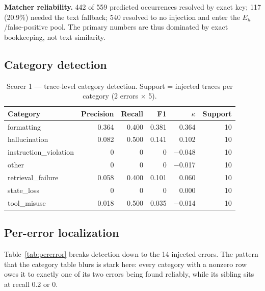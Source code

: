 \documentclass[11pt]{article}
\begin{document}
\textbf{Matcher reliability.} 442 of 559 predicted occurrences resolved by exact key; 117 (20.9\%) needed the text fallback; 540 resolved to no injection and enter the $E_h$/false-positive pool. The primary numbers are thus dominated by exact bookkeeping, not text similarity.

\subsection{Category detection}

\begin{table}[h]
\centering
\small
\begin{tabular}{lrrrrr}
\toprule
Category & Precision & Recall & F1 & $\kappa$ & Support \\
\midrule
formatting              & 0.364 & 0.400 & 0.381 & \phantom{$-$}0.364 & 10 \\
hallucination           & 0.082 & 0.500 & 0.141 & \phantom{$-$}0.102 & 10 \\
instruction\_violation  & 0     & 0     & 0     & $-$0.048 & 10 \\
other                   & 0     & 0     & 0     & $-$0.017 & 10 \\
retrieval\_failure      & 0.058 & 0.400 & 0.101 & \phantom{$-$}0.060 & 10 \\
state\_loss             & 0     & 0     & 0     & \phantom{$-$}0.000 & 10 \\
tool\_misuse            & 0.018 & 0.500 & 0.035 & $-$0.014 & 10 \\
\bottomrule
\end{tabular}
\caption{Scorer 1 --- trace-level category detection. Support = injected traces per category (2 errors $\times$ 5).}
\label{tab:categories}
\end{table}

\subsection{Per-error localization}

Table~\ref{tab:pererror} breaks detection down to the 14 injected errors. The pattern that the category table blurs is stark here: every category with a nonzero row owes it to exactly one of its two errors being found reliably, while its sibling sits at recall 0.2 or 0.
\end{document}
